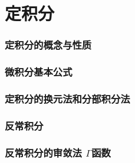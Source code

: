 \documentclass{article}
\begin{document}
  \tableofcontents
  \newpage

  \part{定积分}
  \section{定积分的概念与性质}
    
  \section{微积分基本公式}
    
  \section{定积分的换元法和分部积分法}
    
  \section{反常积分}
    
  \section[反常积分的审敛法 Γ函数]{反常积分的审敛法 $\Gamma$函数}
    
\end{document}
